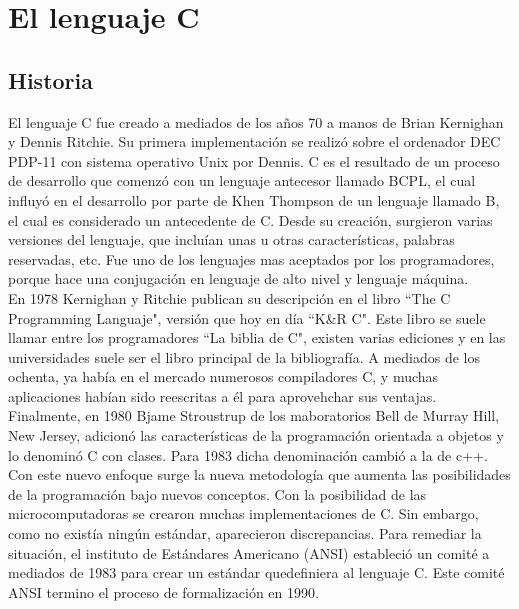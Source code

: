\documentclass[letterpaper, 12pt]{article}
\begin{document}
    \portada[Tarea 02]
    {\centering\section*{\LARGE El lenguaje C}\vspace{1cm}}
        \subsection*{Historia}
        El lenguaje C fue creado a mediados de los años 70 a manos de Brian Kernighan y Dennis Ritchie.
        Su primera implementación se realizó sobre el ordenador DEC PDP-11 con sistema operativo
        Unix por Dennis. C es el resultado de un proceso de desarrollo que comenzó con un lenguaje antecesor
        llamado BCPL, el cual influyó en el desarrollo por parte de Khen Thompson de un lenguaje llamado B, el 
        cual es considerado un antecedente de C. Desde su creación, surgieron varias versiones del lenguaje, que 
        incluían unas u otras características, palabras reservadas, etc. Fue uno de los lenguajes mas aceptados por
        los programadores, porque hace una conjugación en lenguaje de alto nivel y lenguaje máquina.\\
        En 1978 Kernighan y Ritchie publican su descripción en el libro  ``The C Programming Languaje", versión que hoy
        en día ``K\&R C". Este libro se suele llamar entre los programadores ``La biblia de C", existen varias ediciones y 
        en las universidades suele ser el libro principal de la bibliografía.
        A mediados de los ochenta, ya había en el mercado numerosos compiladores C, y muchas aplicaciones habían sido reescritas
        a él para aprovehchar sus ventajas.\\
        
        Finalmente, en 1980 Bjame Stroustrup de los maboratorios Bell de Murray Hill, New Jersey, adicionó las características de 
        la programación orientada a objetos y lo denominó C con clases. Para 1983 dicha denominación cambió a la de c++. Con este
        nuevo enfoque surge la nueva metodología que aumenta las posibilidades de la programación bajo nuevos conceptos.
        Con la posibilidad de las microcomputadoras se crearon muchas implementaciones de C. Sin embargo,
        como no existía ningún estándar, aparecieron discrepancias. Para remediar la situación, el instituto de
        Estándares Americano (ANSI) estableció un comité a mediados de 1983 para crear un estándar quedefiniera al lenguaje C. 
        Este comité ANSI termino el proceso de formalización en 1990. 
\end{document}
